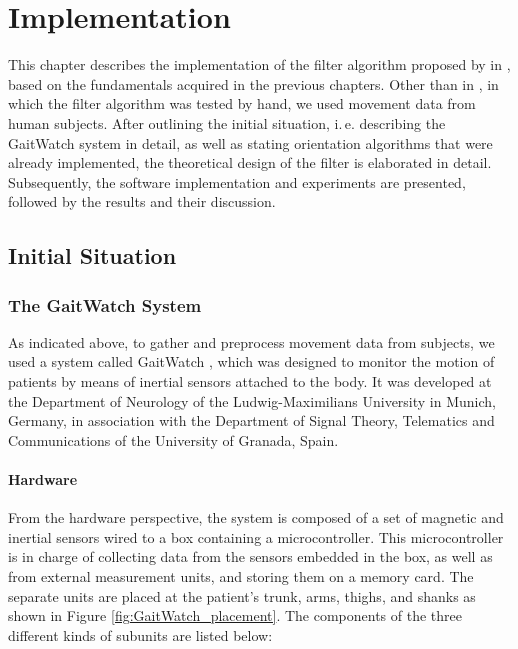 \chapter{Implementation}
\label{ch:Implementation}

This chapter describes the implementation of the filter algorithm proposed by \citeauthor{bennett_motion_2014} in \cite{bennett_motion_2014}, based on the fundamentals acquired in the previous chapters. Other than  in \cite{bennett_motion_2014}, in which the filter algorithm was tested by hand, we used movement data from human subjects. After outlining the initial situation, i.\,e. describing the GaitWatch system in detail, as well as stating orientation algorithms that were already implemented, the theoretical design of the filter is elaborated in detail. Subsequently, the software implementation and experiments are presented, followed by the results and their discussion.

\section{Initial Situation}\label{sec:initial_situation}

\subsection{The GaitWatch System}

As indicated above, to gather and preprocess movement data from subjects, we used a system called GaitWatch \cite{olivares_vicente_gaitwatch_2013}, which was designed to monitor the motion of patients by means of inertial sensors attached to the body. It was developed at the Department of Neurology of the Ludwig-Maximilians University in Munich, Germany, in association with the Department of Signal Theory, Telematics and Communications of the University of Granada, Spain.

\subsubsection{Hardware}

From the hardware perspective, the system is composed of a set of magnetic and inertial sensors wired to a box containing a microcontroller. This microcontroller is in charge of collecting data from the sensors embedded in the box, as well as from  external measurement units, and storing them on a memory card. The separate units are placed at the patient's trunk, arms, thighs, and shanks as shown in Figure \ref{fig:GaitWatch_placement}. The components of the three different kinds of subunits are listed below:

